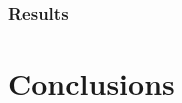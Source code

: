 \documentclass{beamer}
\begin{document}
\begin{frame}
  \frametitle{Results}




\end{frame}
\section[Conclusions]{Conclusions}
\end{document}

